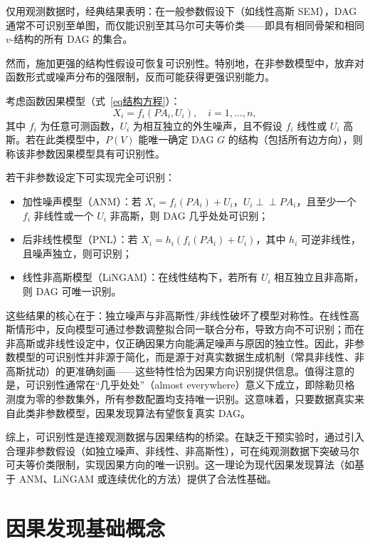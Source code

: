 仅用观测数据时，经典结果表明：在一般参数假设下（如线性高斯 SEM），DAG 通常不可识别至单图，而仅能识别至其马尔可夫等价类——即具有相同骨架和相同 $v$-结构的所有 DAG 的集合。

然而，施加更强的结构性假设可恢复可识别性。特别地，在非参数模型中，放弃对函数形式或噪声分布的强限制，反而可能获得更强识别能力。

\begin{definition}[非参数模型的可识别性]
	考虑函数因果模型（式~\ref{eq结构方程}）：
	\[
	X_i = f_i(PA_i, U_i), \quad i=1,\dots,n,
	\]
	其中 $f_i$ 为任意可测函数，$U_i$ 为相互独立的外生噪声，且不假设 $f_i$ 线性或 $U_i$ 高斯。若在此类模型中，$P(V)$ 能唯一确定 DAG $G$ 的结构（包括所有边方向），则称该非参数因果模型具有可识别性。
\end{definition}

若干非参数设定下可实现完全可识别：

\begin{itemize}
	\item 加性噪声模型（ANM）：若 $X_i = f_i(PA_i) + U_i$，$U_i \perp\!\!\!\perp PA_i$，且至少一个 $f_i$ 非线性或一个 $U_i$ 非高斯，则 DAG 几乎处处可识别\cite{Hoyer2008,Peters2014}；
	\item 后非线性模型（PNL）：若 $X_i = h_i(f_i(PA_i) + U_i)$，其中 $h_i$ 可逆非线性，且噪声独立，则可识别；
	\item 线性非高斯模型（LiNGAM）：在线性结构下，若所有 $U_i$ 相互独立且非高斯，则 DAG 可唯一识别\cite{Shimizu2006}。
\end{itemize}

这些结果的核心在于：独立噪声与非高斯性/非线性破坏了模型对称性。在线性高斯情形中，反向模型可通过参数调整拟合同一联合分布，导致方向不可识别；而在非高斯或非线性设定中，仅正确因果方向能满足噪声与原因的独立性。因此，非参数模型的可识别性并非源于简化，而是源于对真实数据生成机制（常具非线性、非高斯扰动）的更准确刻画——这些特性恰为因果方向识别提供信息。值得注意的是，可识别性通常在“几乎处处”（almost everywhere）意义下成立，即除勒贝格测度为零的参数集外，所有参数配置均支持唯一识别。这意味着，只要数据真实来自此类非参数模型，因果发现算法有望恢复真实 DAG。

综上，可识别性是连接观测数据与因果结构的桥梁。在缺乏干预实验时，通过引入合理非参数假设（如独立噪声、非线性、非高斯性），可在纯观测数据下突破马尔可夫等价类限制，实现因果方向的唯一识别。这一理论为现代因果发现算法（如基于 ANM、LiNGAM 或连续优化的方法）提供了合法性基础。

\section{因果发现基础概念}

